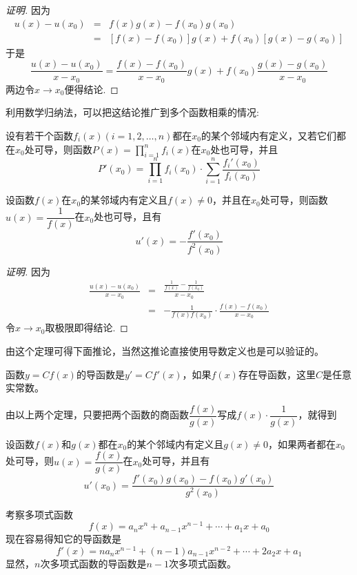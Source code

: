\begin{proof}[证明]
  因为
  \begin{eqnarray*}
    u(x)-u(x_0) & = & f(x)g(x)-f(x_0)g(x_0) \\
                & = & [f(x)-f(x_0)]g(x)+f(x_0)[g(x)-g(x_0)]
  \end{eqnarray*}
  于是
  \[ \frac{u(x)-u(x_0)}{x-x_0} = \frac{f(x)-f(x_0)}{x-x_0}g(x)+f(x_0)\frac{g(x)-g(x_0)}{x-x_0} \]
  两边令$x \to x_0$便得结论.
\end{proof}

利用数学归纳法，可以把这结论推广到多个函数相乘的情况:
\begin{theorem}
  设有若干个函数$f_i(x)(i=1,2,\ldots,n)$都在$x_0$的某个邻域内有定义，又若它们都在$x_0$处可导，则函数$P(x)=\prod\limits_{i=1}^nf_i(x)$在$x_0$处也可导，并且
  \[ P'(x_0) = \prod_{i=1}^nf_i(x_0) \cdot \sum_{i=1}^n \frac{f_i'(x_0)}{f_i(x_0)} \]
\end{theorem}

\begin{theorem}
  设函数$f(x)$在$x_0$的某邻域内有定义且$f(x) \neq 0$，并且在$x_0$处可导，则函数$u(x)=\dfrac{1}{f(x)}$在$x_0$处也可导，且有
  \[ u'(x) = -\frac{f'(x_0)}{f^2(x_0)} \]
\end{theorem}

\begin{proof}[证明]
  因为
  \begin{eqnarray*}
    \frac{u(x)-u(x_0)}{x-x_0} & = & \frac{\frac{1}{f(x)}-\frac{1}{f(x_0)}}{x-x_0} \\
    & = & - \frac{1}{f(x)f(x_0)} \cdot \frac{f(x)-f(x_0)}{x-x_0}
  \end{eqnarray*}
  令$x \to x_0$取极限即得结论.
\end{proof}

由这个定理可得下面推论，当然这推论直接使用导数定义也是可以验证的。
\begin{inference}
  函数$y=Cf(x)$的导函数是$y'=Cf'(x)$，如果$f(x)$存在导函数，这里$C$是任意实常数。
\end{inference}

由以上两个定理，只要把两个函数的商函数$\dfrac{f(x)}{g(x)}$写成$f(x)\cdot \dfrac{1}{g(x)}$，就得到
\begin{theorem}
  设函数$f(x)$和$g(x)$都在$x_0$的某个邻域内有定义且$g(x)\neq 0$，如果两者都在$x_0$处可导，则$u(x)=\dfrac{f(x)}{g(x)}$在$x_0$处可导，并且有
  \[ u'(x_0) = \frac{f'(x_0)g(x_0)-f(x_0)g'(x_0)}{g^2(x_0)} \]
\end{theorem}

\begin{example}
  考察多项式函数
  \[ f(x) = a_nx^n+a_{n-1}x^{n-1}+\cdots+a_1x+a_0 \]
  现在容易得知它的导函数是
  \[ f'(x) = na_nx^{n-1}+(n-1)a_{n-1}x^{n-2}+\cdots+2a_2x+a_1 \]
  显然，$n$次多项式函数的导函数是$n-1$次多项式函数。
\end{example}

